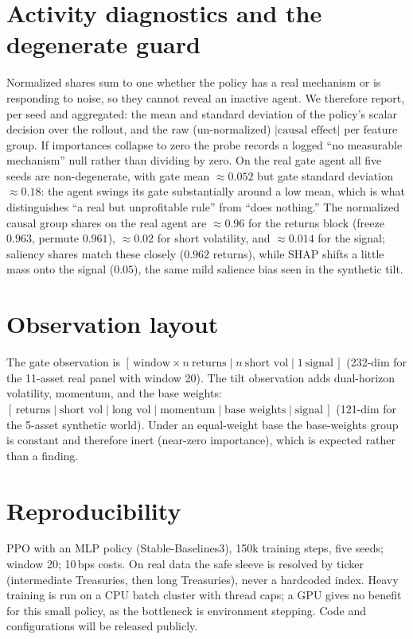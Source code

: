 \documentclass[sigconf,anonymous,review]{acmart}
\begin{document}
\section{Activity diagnostics and the degenerate guard}\label{app:activity}
Normalized shares sum to one whether the policy has a real mechanism or is responding
to noise, so they cannot reveal an inactive agent. We therefore report, per seed and
aggregated: the mean and standard deviation of the policy's scalar decision over the
rollout, and the raw (un-normalized) $\lvert\text{causal effect}\rvert$ per feature
group. If importances collapse to zero the probe records a logged ``no measurable
mechanism'' null rather than dividing by zero. On the real gate agent all five seeds
are non-degenerate, with gate mean $\approx0.052$ but gate standard deviation
$\approx0.18$: the agent swings its gate substantially around a low mean, which is
what distinguishes ``a real but unprofitable rule'' from ``does nothing.'' The
normalized causal group shares on the real agent are $\approx0.96$ for the returns
block (freeze $0.963$, permute $0.961$), $\approx0.02$ for short volatility, and
$\approx0.014$ for the signal; saliency shares match these closely ($0.962$ returns),
while SHAP shifts a little mass onto the signal ($0.05$), the same mild salience bias
seen in the synthetic tilt.

\section{Observation layout}\label{app:obs}
The gate observation is $[\,\text{window}\times n\ \text{returns}\mid n\ \text{short
vol}\mid 1\ \text{signal}\,]$ (232-dim for the 11-asset real panel with window 20).
The tilt observation adds dual-horizon volatility, momentum, and the base weights:
$[\,\text{returns}\mid\text{short vol}\mid\text{long vol}\mid\text{momentum}\mid
\text{base weights}\mid\text{signal}\,]$ (121-dim for the 5-asset synthetic world).
Under an equal-weight base the base-weights group is constant and therefore inert
(near-zero importance), which is expected rather than a finding.

\section{Reproducibility}\label{app:repro}
PPO with an MLP policy (Stable-Baselines3), 150k training steps, five seeds; window
20; 10\,bps costs. On real data the safe sleeve is resolved by ticker (intermediate
Treasuries, then long Treasuries), never a hardcoded index. Heavy training is run on a
CPU batch cluster with thread caps; a GPU gives no benefit for this small policy, as
the bottleneck is environment stepping. Code and configurations will be released
publicly.
\end{document}
